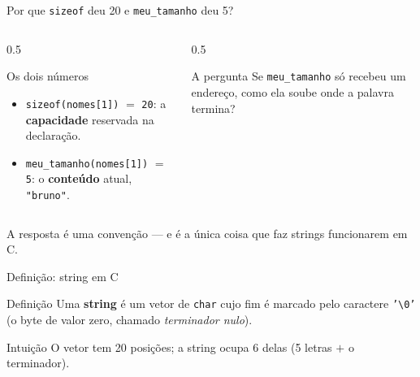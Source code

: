 \documentclass[aspectratio=169]{beamer}
\begin{document}
\begin{frame}{Por que \texttt{sizeof} deu 20 e \texttt{meu\_tamanho} deu 5?}
  \begin{columns}[T]
    \begin{column}{0.5\textwidth}
      \begin{block}{Os dois números}
        \begin{itemize}
          \item \texttt{sizeof(nomes[1])} $=$ \texttt{20}: a \textbf{capacidade}
                reservada na declaração.
          \item \texttt{meu\_tamanho(nomes[1])} $=$ \texttt{5}: o
                \textbf{conteúdo} atual, \texttt{"bruno"}.
        \end{itemize}
      \end{block}
    \end{column}
    \begin{column}{0.5\textwidth}
      \begin{alertblock}{A pergunta}
        Se \texttt{meu\_tamanho} só recebeu um endereço, como ela soube onde a
        palavra termina?
      \end{alertblock}
    \end{column}
  \end{columns}
  \begin{center}\small
    A resposta é uma convenção --- e é a única coisa que faz strings
    funcionarem em C.
  \end{center}
\end{frame}

\begin{frame}{Definição: string em C}
  \begin{block}{Definição}
    Uma \textbf{string} é um vetor de \texttt{char} cujo fim é marcado pelo
    caractere \texttt{'\textbackslash 0'} (o byte de valor zero, chamado
    \emph{terminador nulo}).
  \end{block}
  \begin{center}
  \end{center}
  \begin{exampleblock}{Intuição}
    O vetor tem 20 posições; a string ocupa 6 delas (5 letras $+$ o terminador).
  \end{exampleblock}
\end{frame}
\end{document}
